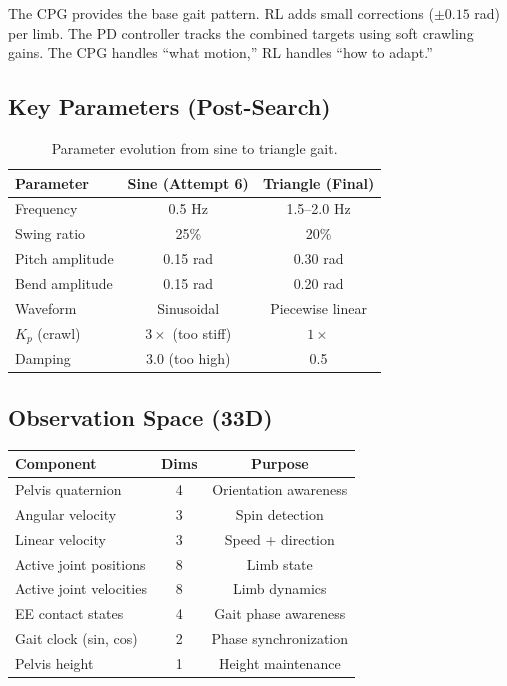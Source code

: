 \documentclass[11pt, a4paper]{article}
\begin{document}
The CPG provides the base gait pattern. RL adds small corrections ($\pm 0.15$ rad) per limb. The PD controller tracks the combined targets using soft crawling gains. The CPG handles ``what motion,'' RL handles ``how to adapt.''

\subsection{Key Parameters (Post-Search)}

\begin{table}[H]
\centering
\begin{tabular}{lcc}
\toprule
\textbf{Parameter} & \textbf{Sine (Attempt 6)} & \textbf{Triangle (Final)} \\
\midrule
Frequency & 0.5 Hz & 1.5--2.0 Hz \\
Swing ratio & 25\% & 20\% \\
Pitch amplitude & 0.15 rad & 0.30 rad \\
Bend amplitude & 0.15 rad & 0.20 rad \\
Waveform & Sinusoidal & Piecewise linear \\
$K_p$ (crawl) & $3\times$ (too stiff) & $1\times$ \\
Damping & 3.0 (too high) & 0.5 \\
\bottomrule
\end{tabular}
\caption{Parameter evolution from sine to triangle gait.}
\end{table}

\subsection{Observation Space (33D)}

\begin{table}[H]
\centering\small
\begin{tabular}{lcc}
\toprule
\textbf{Component} & \textbf{Dims} & \textbf{Purpose} \\
\midrule
Pelvis quaternion & 4 & Orientation awareness \\
Angular velocity & 3 & Spin detection \\
Linear velocity & 3 & Speed + direction \\
Active joint positions & 8 & Limb state \\
Active joint velocities & 8 & Limb dynamics \\
EE contact states & 4 & Gait phase awareness \\
Gait clock (sin, cos) & 2 & Phase synchronization \\
Pelvis height & 1 & Height maintenance \\
\bottomrule
\end{tabular}
\end{table}
\end{document}
